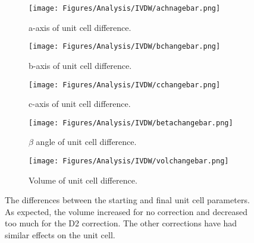 \begin{figure}[!htb]
\centering

\begin{subfigure}{0.49\textwidth}
\centering
\texttt{[image: Figures/Analysis/IVDW/achnagebar.png]}
\caption{a-axis of unit cell difference.}
\label{fig:StructAnal_D2}
\end{subfigure}
\begin{subfigure}{0.49\textwidth}
\centering
\texttt{[image: Figures/Analysis/IVDW/bchangebar.png]}
\caption{b-axis of unit cell difference.}
\label{fig:StructAnal_D3}
\end{subfigure}

\begin{subfigure}{0.49\textwidth}
\centering
\texttt{[image: Figures/Analysis/IVDW/cchangebar.png]}
\caption{c-axis of unit cell difference.}
\label{fig:StructAnal_D3BJ}
\end{subfigure}
\begin{subfigure}{0.49\textwidth}
\centering
\texttt{[image: Figures/Analysis/IVDW/betachangebar.png]}
\caption{\(\beta\) angle of unit cell difference.}
\label{fig:StructAnal_TS}
\end{subfigure}

\begin{subfigure}{0.49\textwidth}
\centering
\texttt{[image: Figures/Analysis/IVDW/volchangebar.png]}
\caption{Volume of unit cell difference.}
\label{fig:volchange}
\end{subfigure}

\captionsetup{font = footnotesize, justification = centering}
\caption[Differences between the Starting and Final Unit Cell Parameters]{The differences between the starting and final unit cell parameters. As expected, the volume increased for no correction and decreased too much for the D2 correction. The other corrections have had similar effects on the unit cell.\DIFdelbeginFL {}%
\DIFdelendFL }
\label{Fig:UnitCellParams}
\end{figure}

